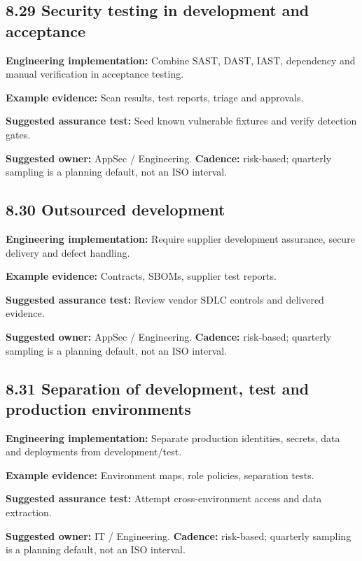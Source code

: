 \documentclass[11pt,letterpaper]{article}
\begin{document}
\subsection{8.29 Security testing in development and acceptance}
\textbf{Engineering implementation:} Combine SAST, DAST, IAST, dependency and manual verification in acceptance testing.\par
\textbf{Example evidence:} Scan results, test reports, triage and approvals.\par
\textbf{Suggested assurance test:} Seed known vulnerable fixtures and verify detection gates.\par
\textbf{Suggested owner:} AppSec / Engineering. \textbf{Cadence:} risk-based; quarterly sampling is a planning default, not an ISO interval.\par
{}
\subsection{8.30 Outsourced development}
\textbf{Engineering implementation:} Require supplier development assurance, secure delivery and defect handling.\par
\textbf{Example evidence:} Contracts, SBOMs, supplier test reports.\par
\textbf{Suggested assurance test:} Review vendor SDLC controls and delivered evidence.\par
\textbf{Suggested owner:} AppSec / Engineering. \textbf{Cadence:} risk-based; quarterly sampling is a planning default, not an ISO interval.\par
{}
\subsection{8.31 Separation of development, test and production environments}
\textbf{Engineering implementation:} Separate production identities, secrets, data and deployments from development/test.\par
\textbf{Example evidence:} Environment maps, role policies, separation tests.\par
\textbf{Suggested assurance test:} Attempt cross-environment access and data extraction.\par
\textbf{Suggested owner:} IT / Engineering. \textbf{Cadence:} risk-based; quarterly sampling is a planning default, not an ISO interval.\par
{}
\end{document}

